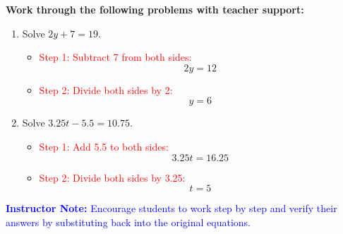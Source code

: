 \documentclass[12pt]{article}
\begin{document}
\begin{tcolorbox}[colframe=black!60, colback=white, 
coltitle=black, colbacktitle=black!15, fonttitle=\bfseries\Large, 
title=Guided Practice, halign title=center, left=10pt, right=10pt, top=10pt, bottom=15pt]
\textbf{Work through the following problems with teacher support:}
\begin{enumerate}[itemsep=3em]
    \item Solve \( 2y + 7 = 19 \).
    \begin{itemize}
        \item \textcolor{red}{Step 1: Subtract 7 from both sides:}
        \[
        2y = 12
        \]
        \item \textcolor{red}{Step 2: Divide both sides by 2:}
        \[
        y = 6
        \]
    \end{itemize}

    \item Solve \( 3.25t - 5.5 = 10.75 \).
    \begin{itemize}
        \item \textcolor{red}{Step 1: Add 5.5 to both sides:}
        \[
        3.25t = 16.25
        \]
        \item \textcolor{red}{Step 2: Divide both sides by 3.25:}
        \[
        t = 5
        \]
    \end{itemize}
\end{enumerate}

\textcolor{blue}{\textbf{Instructor Note:} Encourage students to work step by step and verify their answers by substituting back into the original equations.}
\end{tcolorbox}

\vspace{1em}
\end{document}
